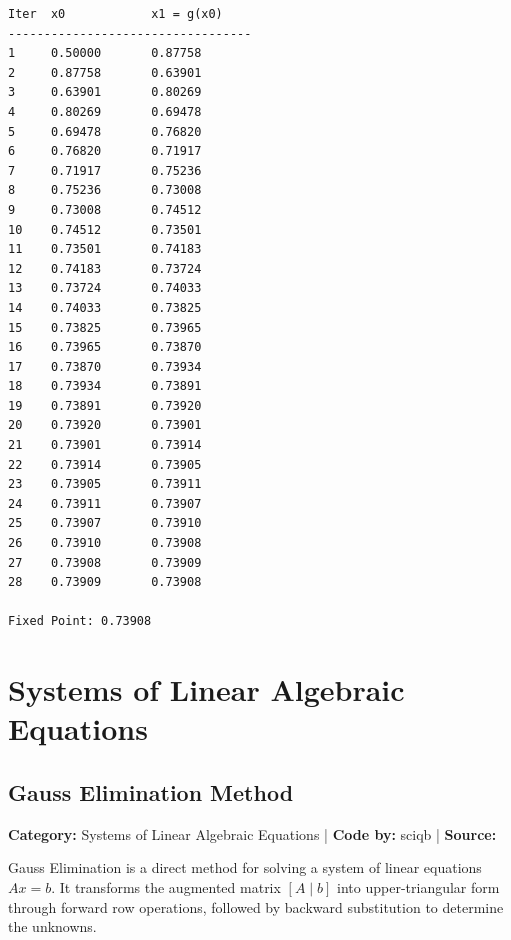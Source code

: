 \documentclass[10pt,a4paper]{report}
\begin{document}
\begin{tcolorbox}[colback=termbg,colframe=primary,title=\textbf{Program Execution Output \& Convergence Table},boxrule=1pt,arc=2mm]
\begin{lstlisting}[style=terminal_output]
Iter  x0            x1 = g(x0)    
----------------------------------
1     0.50000       0.87758       
2     0.87758       0.63901       
3     0.63901       0.80269       
4     0.80269       0.69478       
5     0.69478       0.76820       
6     0.76820       0.71917       
7     0.71917       0.75236       
8     0.75236       0.73008       
9     0.73008       0.74512       
10    0.74512       0.73501       
11    0.73501       0.74183       
12    0.74183       0.73724       
13    0.73724       0.74033       
14    0.74033       0.73825       
15    0.73825       0.73965       
16    0.73965       0.73870       
17    0.73870       0.73934       
18    0.73934       0.73891       
19    0.73891       0.73920       
20    0.73920       0.73901       
21    0.73901       0.73914       
22    0.73914       0.73905       
23    0.73905       0.73911       
24    0.73911       0.73907       
25    0.73907       0.73910       
26    0.73910       0.73908       
27    0.73908       0.73909       
28    0.73909       0.73908       

Fixed Point: 0.73908
\end{lstlisting}
\end{tcolorbox}

\newpage

\chapter{Systems of Linear Algebraic Equations}


\section{Gauss Elimination Method}
\textbf{Category:} \textcolor{secondary}{Systems of Linear Algebraic Equations} \quad | \quad \textbf{Code by:} \textcolor{secondary}{sciqb} \quad | \quad \textbf{Source:} \texttt{}

Gauss Elimination is a direct method for solving a system of linear equations $A x = b$. It transforms the augmented matrix $[A \mid b]$ into upper-triangular form through forward row operations, followed by backward substitution to determine the unknowns.
\end{document}
